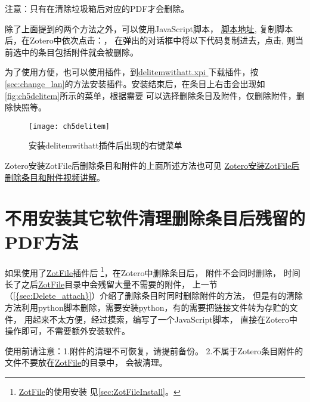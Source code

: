 \documentclass[cn,11pt,chinese]{elegantbook}
\begin{document}
	注意：只有在清除垃圾箱后对应的PDF才会删除。

				除了上面提到的两个方法之外，可以使用JavaScript脚本，
				\href{https://raw.githubusercontent.com/redleafnew/zotero-javascripts/main/5delete%20the%20addachments%20when%20the%20items%20were%20removed.js}{脚本地址},
				复制脚本后，在Zotero中依次点击：，
				在弹出的对话框中将以下代码复制进去，点击,
				则当前选中的条目包括附件就会被删除。

				为了使用方便，也可以使用插件，到\href{https://github.com/redleafnew/delitemwithatt/releases}{delitemwithatt.xpi
				}下载插件，按\cref{sec:change_lan}的方法安装插件。安装结束后，在条目上右击会出现如\autoref{fig:ch5delitem}所示的菜单，根据需要
				可以选择删除条目及附件，仅删除附件，删除快照等。

				
					\begin{figure}[ht]
						\centering
						\texttt{[image: ch5delitem]}
						\caption{安装delitemwithatt插件后出现的右键菜单}
						\label{fig:ch5delitem}
					\end{figure}

					Zotero安装ZotFile后删除条目和附件的上面所述方法也可见
					\href{https://zhuanlan.zhihu.com/p/369141058}{Zotero安装ZotFile后删除条目和附件视频讲解}。

	\section{不用安装其它软件清理删除条目后残留的PDF方法}\label{sec:delPDFUingJS}
			如果使用了\href{http://zotfile.com/}{ZotFile}插件后
			\footnote{\href{http://zotfile.com/}{ZotFile}的使用安装
			见\cref{sec:ZotFileInstall}。}，在Zotero中删除条目后，
			附件不会同时删除，
			时间长了之后\href{http://zotfile.com/}{ZotFile}目录中会残留大量不需要的附件，
			上一节（\cref{{sec:Delete_attach}}）介绍了删除条目时同时删除附件的方法，
			但是有的清除方法利用python脚本删除，需要安装python，有的需要把链接文件转为存贮的文件，
			用起来不太方便，经过摸索，编写了一个JavaScript脚本，
			直接在Zotero中操作即可，不需要额外安装软件。
			
			使用前请注意：1.附件的清理不可恢复，请提前备份。
			2.不属于Zotero条目附件的文件不要放在\href{http://zotfile.com/}{ZotFile}的目录中，
			会被清理。
\end{document}

